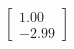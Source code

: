 \documentclass[preview]{standalone}
\begin{document}
\begin{align*}
\begin{bmatrix} 1.00 \\ -2.99 \end{bmatrix}
\end{align*}
\end{document}
